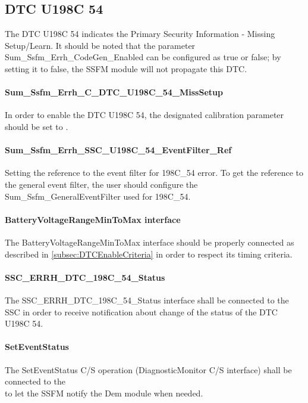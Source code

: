 \subsection{DTC U198C 54}
\label{subsec:SSFMERRHDTCU198C54Handler}

The DTC U198C 54 indicates the Primary Security Information - Missing Setup/Learn.
It should be noted that the parameter Sum\_Ssfm\_Errh\_CodeGen\_Enabled can be configured as true or false; by setting it to false, the SSFM module will not propagate this DTC.

\paragraph{Sum\_Ssfm\_Errh\_C\_DTC\_U198C\_54\_MissSetup }
In order to enable the DTC U198C 54, the designated calibration parameter should be set to .

\paragraph{Sum\_Ssfm\_Errh\_SSC\_U198C\_54\_EventFilter\_Ref} 
Setting the reference to the event filter for 198C\_54 error.
To get the reference to the general event filter, the user should configure the \\Sum\_Ssfm\_GeneralEventFilter used for 198C\_54.

\paragraph{BatteryVoltageRangeMinToMax interface}
The BatteryVoltageRangeMinToMax interface should be properly connected as described in \ref{subsec:DTCEnableCriteria} in order to respect its timing criteria.

\paragraph{SSC\_ERRH\_DTC\_198C\_54\_Status}
The SSC\_ERRH\_DTC\_198C\_54\_Status interface shall be connected to the SSC in order to receive notification about change of the status of the DTC U198C 54.

\paragraph{SetEventStatus}
The SetEventStatus C/S operation (DiagnosticMonitor C/S interface) shall be connected to the \\ to let the SSFM notify the Dem module when needed.


